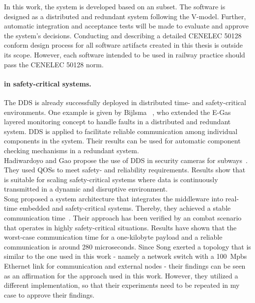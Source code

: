 In this work, the system is developed based on an  subset.
The software is designed as a distributed and redundant system following the V-model.
Further, automatic integration and acceptance tests will be made to evaluate and approve the system's decisions.
Conducting and describing a detailed CENELEC 50128 conform design process for all software artifacts created in this thesis is outside its scope.
However, each software intended to be used in railway practice should pass the CENELEC 50128 norm.

\paragraph{ in safety-critical systems.}
The \gls*{DDS} is already successfully deployed in distributed time- and safety-critical environments.
One example is given by Bijlsma \etal~\cite{DistributedSafety2020}, who extended the E-Gas layered monitoring concept to handle faults in a distributed and redundant system.
\Gls*{DDS} is applied to facilitate reliable communication among individual components in the system.
Their results can be used for automatic component checking mechanisms in a redundant system.
\\

Hadiwardoyo and Gao propose the use of \gls*{DDS} in security cameras for subways~\cite{DDSInSubways}.
They used \glspl*{QOS} to meet safety- and reliability requirements.
Results show that  is suitable for scaling safety-critical systems where data is continuously transmitted in a dynamic and disruptive environment.
\\

Song \etal proposed a system architecture that integrates the  middleware into real-time embedded and safety-critical systems.
Thereby, they achieved a stable communication time~\cite{SongDDSInRealTimeSystems}.
Their approach has been verified by an  combat scenario that operates in highly safety-critical situations.
Results have shown that the worst-case communication time for a one-kilobyte payload and a reliable communication  is around 280 microseconds.
Since Song \etal exerted a topology that is similar to the one used in this work - namely a network switch with a 100~Mpbs Ethernet link for communication and external nodes - their findings can be seen as an affirmation for the approach used in this work.
However, they utilized a different  implementation, so that their experiments need to be repeated in my case to approve their findings. 
\\

